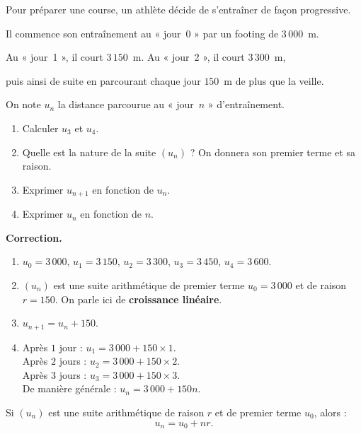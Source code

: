 \documentclass[10pt,a4paper]{article}
\newenvironment{correction}{\par\medskip\noindent\textbf{Correction.} }{\par\medskip}
\begin{document}
\begin{meth}

	Pour préparer une course, un athlète décide de s'entraîner de façon progressive.

	Il commence son entraînement au « jour~0 » par un footing de $3\,000$~m.

	Au « jour~1 », il court $3\,150$~m. Au « jour~2 », il court $3\,300$~m,

	puis ainsi de suite en parcourant chaque jour $150$~m de plus que la veille.

	On note $u_n$ la distance parcourue au « jour~$n$ » d'entraînement.

	\begin{enumerate}
		\item[a)] Calculer $u_3$ et $u_4$.
		\item[b)] Quelle est la nature de la suite $(u_n)$ ? On donnera son premier terme et sa raison.
		\item[c)] Exprimer $u_{n+1}$ en fonction de $u_n$.
		\item[d)] Exprimer $u_n$ en fonction de $n$.
	\end{enumerate}

	\begin{correction}
		\begin{enumerate}
			\item[a)] $u_0 = 3\,000$, $u_1 = 3\,150$, $u_2 = 3\,300$, $u_3 = 3\,450$, $u_4 = 3\,600$.

			\item[b)] $(u_n)$ est une suite arithmétique de premier terme $u_0 = 3\,000$ et de raison $r = 150$.
			      On parle ici de \textbf{croissance linéaire}.

			\item[c)] $u_{n+1} = u_n + 150$.

			\item[d)] Après $1$ jour : $u_1 = 3\,000 + 150 \times 1$. \\
			      Après $2$ jours : $u_2 = 3\,000 + 150 \times 2$. \\
			      Après $3$ jours : $u_3 = 3\,000 + 150 \times 3$. \\
			      De manière générale : $u_n = 3\,000 + 150n$.
		\end{enumerate}
	\end{correction}
\end{meth}

\begin{prop}
	Si $(u_n)$ est une suite arithmétique de raison $r$ et de premier terme $u_0$, alors :
	$$
		u_n = u_0 + nr.
	$$
\end{prop}
\end{document}
